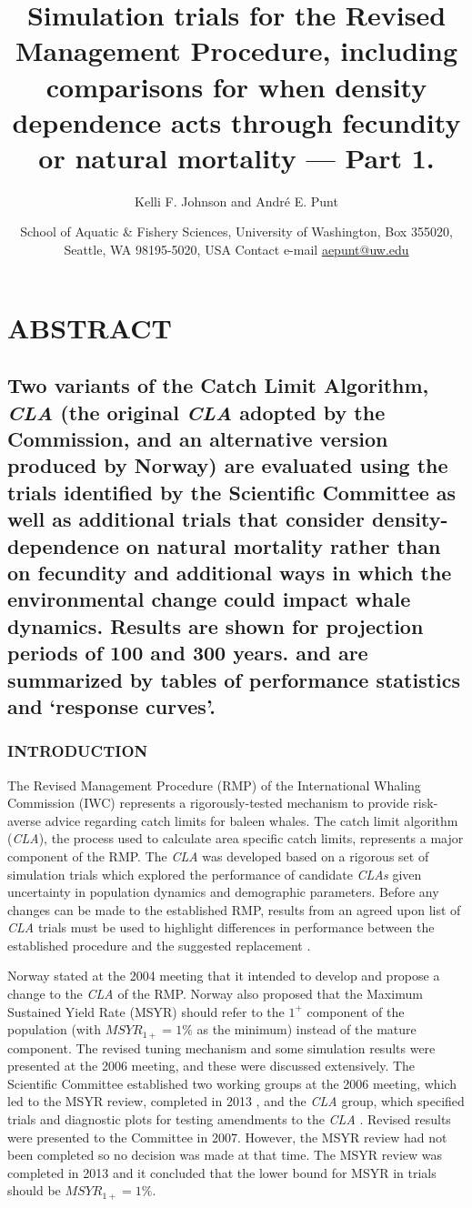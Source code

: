 \documentclass[]{article}
\title{Simulation trials for the Revised Management Procedure, including
comparisons for when density dependence acts through fecundity or
natural mortality --- Part 1.}
\author{Kelli F. Johnson and Andr\'{e} E. Punt}
\date{School of Aquatic \& Fishery Sciences, University of Washington,
Box 355020, Seattle, WA 98195-5020, USA
Contact e-mail \href{mailto:aepunt@uw.edu}{aepunt@uw.edu}}
\begin{document}
\maketitle

\section{ABSTRACT}\label{abstract}

\subsection{Two variants of the Catch Limit Algorithm, \emph{CLA} (the
original \emph{CLA} adopted by the Commission, and an alternative
version produced by Norway) are evaluated using the trials identified by
the Scientific Committee as well as additional trials that consider
density-dependence on natural mortality rather than on fecundity and
additional ways in which the environmental change could impact whale
dynamics. Results are shown for projection periods of 100 and 300 years.
and are summarized by tables of performance statistics and
`response curves'.}

\subsubsection{INTRODUCTION}\label{introduction}

The Revised Management Procedure (RMP) of the International Whaling
Commission (IWC) \autocite{iwc_2013_rmp} represents a rigorously-tested
mechanism to provide risk-averse advice regarding catch limits for
baleen whales. The catch limit algorithm (\emph{CLA}), the process used
to calculate area specific catch limits, represents a major component of
the RMP. The \emph{CLA} was developed based on a rigorous set of
simulation trials which explored the performance of candidate
\emph{CLAs} given uncertainty in population dynamics and demographic
parameters. Before any changes can be made to the established RMP,
results from an agreed upon list of \emph{CLA} trials must be used to
highlight differences in performance between the established procedure
and the suggested replacement \autocite{iwc_2007}.

Norway stated at the 2004 meeting that it intended to develop and
propose a change to the \emph{CLA} of the RMP. Norway also proposed that
the Maximum Sustained Yield Rate (MSYR) should refer to the $1^+$
component of the population (with $MSYR_{1+} = 1\%$ as the minimum)
instead of the mature component. The revised tuning mechanism and some
simulation results were presented at the 2006 meeting, and these were
discussed extensively. The Scientific Committee established two working
groups at the 2006 meeting, which led to the MSYR review,
completed in 2013 \autocite{iwc_2013}, and the \emph{CLA} group,
which specified trials and diagnostic plots for testing amendments
to the \emph{CLA} \autocite{iwc_2007}.
Revised results \autocite{aldrin_2007} were presented to the Committee in 2007.
However, the MSYR review had not been completed so no decision was made
at that time. The MSYR review was completed in 2013 and it concluded
that the lower bound for MSYR in trials should be $MSYR_{1+} = 1\%$.
\end{document}
